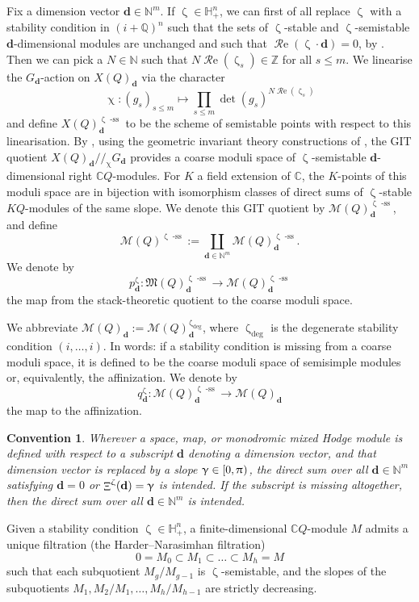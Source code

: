 \documentclass[a4paper,10pt]{amsart}
\newtheorem{convention}[theorem]{Convention}
\newcommand{\dd}{\mathbf{d}}
\newcommand{\Mst}{\mathfrak{M}}
\newcommand{\Msp}{\mathcal{M}}
\renewcommand{\gamma}{\upgamma}
\renewcommand{\zeta}{\upzeta}
\renewcommand{\pi}{\uppi\hspace{0.05em}}
\renewcommand{\chi}{\upchi}
\DeclareMathOperator{\RRe}{\mathcal{R}e}
\DeclareMathOperator{\sst}{-ss}
\DeclareMathOperator{\Mu}{\Upxi}
\begin{document}
Fix a dimension vector $\dd\in\mathbb{N}^m$.  If $\zeta\in \mathbb{H}_+^n$, we can first of all replace $\zeta$ with a stability condition in $(i+\mathbb{Q})^n$ such that the sets of $\zeta$-stable and $\zeta$-semistable $\dd$-dimensional modules are unchanged and such that $\RRe(\zeta\cdot \dd)=0$, by \cite[Lem.4.21]{DMSS13}.  Then we can pick a $N\in\mathbb{N}$ such that $N\RRe(\zeta_s)\in\mathbb{Z}$ for all $s\leq m$.  We linearise the $G_\dd$-action on $X(Q)_\dd$ via the character 
\[
\chi\colon (g_s)_{s\leq m}\mapsto\prod_{s\leq m}\det(g_s)^{N\RRe(\zeta_s)}
\]
and define $X(Q)^{\zeta\sst}_\dd$ to be the scheme of semistable points with respect to this linearisation.  By \cite{King94}, using the geometric invariant theory constructions of \cite{MFK94}, the GIT quotient $X(Q)_{\dd}/\!\!/_{\chi} G_\dd$ provides a coarse moduli space of $\zeta$-semistable $\dd$-dimensional right $\mathbb{C}Q$-modules.  For $K$ a field extension of $\mathbb{C}$, the $K$-points of this moduli space are in bijection with isomorphism classes of direct sums of $\zeta$-stable $KQ$-modules \cite[Prop.3.2]{King94} of the same slope.  We denote this GIT quotient by $\Msp(Q)^{\zeta\sst}_\dd$, and define
\[
\Msp(Q)^{\zeta\sst}:=\coprod_{\dd\in\mathbb{N}^{m}}\Msp(Q)_{\dd}^{\zeta\sst}.
\]
We denote by 
\begin{equation}
\label{pdef}
p^{\zeta}_{\dd}\colon \Mst(Q)^{\zeta\sst}_\dd\rightarrow\Msp(Q)^{\zeta\sst}_\dd
\end{equation}
the map from the stack-theoretic quotient to the coarse moduli space.

We abbreviate $\Msp(Q)_{\dd}:=\Msp(Q)_{\dd}^{\zeta_{\deg}}$, where $\zeta_{\deg}$ is the degenerate stability condition $(i,\ldots,i)$.  In words: if a stability condition is missing from a coarse moduli space, it is defined to be the coarse moduli space of semisimple modules or, equivalently, the affinization.  We denote by 
\begin{equation}
q_{\dd}^{\zeta}\colon\Msp(Q)^{\zeta\sst}_{\dd}\rightarrow \Msp(Q)_{\dd}
\end{equation}
the map to the affinization.
\begin{convention}
Wherever a space, map, or monodromic mixed Hodge module is defined with respect to a subscript $\dd$ denoting a dimension vector, and that dimension vector is replaced by a slope $\gamma\in [0,\pi)$, the direct sum over all $\dd\in\mathbb{N}^m$ satisfying $\dd=0$ or $\Mu^{\zeta}(\dd)=\gamma$ is intended.  If the subscript is missing altogether, then the direct sum over all $\dd\in\mathbb{N}^m$ is intended.
\end{convention}
Given a stability condition $\zeta\in\mathbb{H}_+^n$, a finite-dimensional $\mathbb{C}Q$-module $M$ admits a unique filtration (the Harder--Narasimhan filtration)
\[
0=M_0\subset M_1\subset\ldots\subset M_h=M
\]
such that each subquotient $M_g/M_{g-1}$ is $\zeta$-semistable, and the slopes of the subquotients $M_1,M_2/M_1,\ldots,M_h/M_{h-1}$ are strictly decreasing.  
\end{document}
